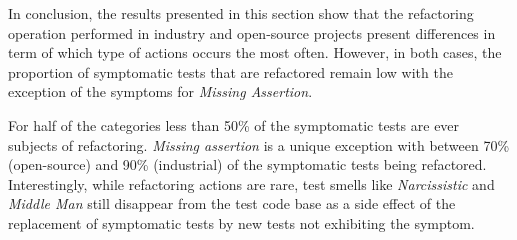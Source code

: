In conclusion, the results presented in this section show that the refactoring operation performed in industry and open-source projects present differences in term of which type of actions occurs the most often. However, in both cases, the proportion of symptomatic tests that are refactored remain low with the exception of the symptoms for \emph{Missing Assertion}. 


For half of the categories less than 50\% of the symptomatic tests are ever subjects of refactoring. \emph{Missing assertion} is a unique exception with between 70\% (open-source) and 90\% (industrial) of the symptomatic tests being refactored. Interestingly, while refactoring actions are rare, test smells like \emph{Narcissistic} and \emph{Middle Man} still disappear from the test code base as a side effect of the replacement of symptomatic tests by new tests not exhibiting the symptom.